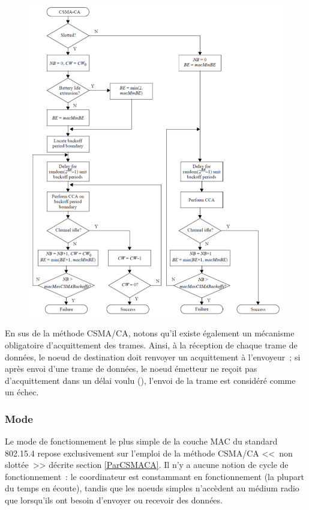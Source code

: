 \begin{figure}[!pthb]
\centering
\includegraphics[width=14.25cm]{images/ch3-csma-ca-std.png}
\label{FigOrganigrammeCSMACA}
\end{figure}

En sus de la méthode CSMA/CA, notons qu'il existe également un mécanisme
obligatoire d'acquittement des trames. Ainsi, à la réception de chaque
trame de données, le noeud de destination doit renvoyer un acquittement
à l'envoyeur~; si après envoi d'une trame de données, le noeud émetteur
ne reçoit pas d'acquittement dans un délai voulu (),
l'envoi de la trame est considéré comme un échec.

\subsubsection{Mode }
\label{Par802154MACSimple}

Le mode de fonctionnement le plus simple de la couche MAC du standard
802.15.4 repose exclusivement sur l'emploi de la méthode CSMA/CA <<~non
slottée~>> décrite section \vref{ParCSMACA}. Il n'y a aucune notion de cycle
de fonctionnement~: le coordinateur est constammant en fonctionnement
(la plupart du temps en écoute), tandis que les noeuds simples n'accèdent
au médium radio que lorsqu'ils ont besoin d'envoyer ou recevoir des données.

